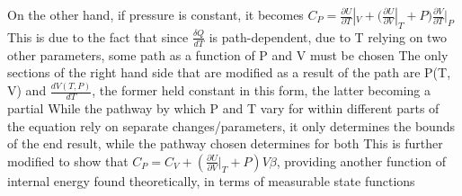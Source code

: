 \documentclass[11 pt, twoside]{article}
\newenvironment{outline*}
{
	\begin{outline}[enumerate]
	}
	{\end{outline}
}
\begin{document}
\begin{outline*}
\2 On the other hand, if pressure is constant, it becomes $C_P = \frac{\partial U}{\partial T}|_V + (\frac{\partial U}{\partial V}|_T + P)\frac{\partial V}{\partial T}|_P$
\3 This is due to the fact that since $\frac{\delta Q}{dT}$ is path-dependent, due to T relying on two other parameters, some path as a function of P and V must be chosen
\4 The only sections of the right hand side that are modified as a result of the path are P(T, V) and $\frac{dV(T, P)}{dT}$, the former held constant in this form, the latter becoming a partial
\4 While the pathway by which P and T vary for within different parts of the equation rely on separate changes/parameters, it only determines the bounds of the end result, while the pathway chosen determines for both
\3 This is further modified to show that $C_P = C_V + (\frac{\partial U}{\partial V}|_T + P)V\beta$, providing another function of internal energy found theoretically, in terms of measurable state functions
\end{outline*}
\end{document}
